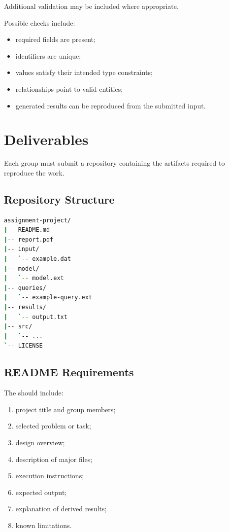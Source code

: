 \documentclass[11pt]{article}
\newcommand{\code}[1]{\texttt{\detokenize{#1}}}
\begin{document}
Additional validation may be included where appropriate.

Possible checks include:

\begin{itemize}
    \item required fields are present;
    \item identifiers are unique;
    \item values satisfy their intended type constraints;
    \item relationships point to valid entities;
    \item generated results can be reproduced from the submitted input.
\end{itemize}

\section{Deliverables}

Each group must submit a repository containing the artifacts required to
reproduce the work.

\subsection{Repository Structure}

\begin{lstlisting}[language=bash]
assignment-project/
|-- README.md
|-- report.pdf
|-- input/
|   `-- example.dat
|-- model/
|   `-- model.ext
|-- queries/
|   `-- example-query.ext
|-- results/
|   `-- output.txt
|-- src/
|   `-- ...
`-- LICENSE
\end{lstlisting}

\subsection{README Requirements}

The \code{README.md} should include:

\begin{enumerate}
    \item project title and group members;
    \item selected problem or task;
    \item design overview;
    \item description of major files;
    \item execution instructions;
    \item expected output;
    \item explanation of derived results;
    \item known limitations.
\end{enumerate}
\end{document}

